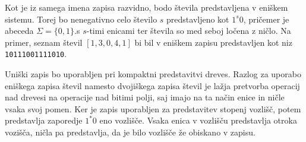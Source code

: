 Kot je iz samega imena zapisa razvidno, bodo števila predstavljena v eniškem sistemu. Torej bo nenegativno celo število $s$ predstavljeno kot $1^s0$, pričemer je abeceda $\Sigma=\{0,1\}$.s $s$-timi enicami ter števila so med seboj ločena z ničlo. Na primer, seznam števil $[1,3,0,4,1]$ bi bil v eniškem zapisu predstavljen kot niz \texttt{10111001111010}.

Uniški zapis bo uporabljen pri kompaktni predstavitvi dreves. Razlog za uporabo eniškega zapisa števil namesto dvojiškega zapisa števil je lažja pretvorba operacij nad drevesi na operacije nad bitimi polji, saj imajo na ta način enice in ničle vsaka svoj pomen. Ker je zapis uporabljen za predstavitev stopenj vozlišč, potem predstavlja zaporedje $1^*0$ eno vozlišče. Vsaka enica v vozlišču predstavlja otroka vozišča, ničla pa predstavlja, da je bilo vozlišče že obiskano v zapisu.

